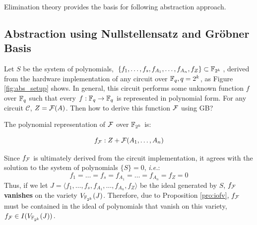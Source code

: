 Elimination theory provides the basis for following abstraction approach.
\subsection{Abstraction using Nullstellensatz and Gr\"obner Basis}
\begin{figure}[H]
\end{figure}

\begin{Problem}
\label{setup:abs}
Let $S$ be the system of polynomials, 
$\{f_1,\dots,f_s,f_{A_1},\dots,f_{A_n},f_{Z}\}\subset {\mathbb{F}}_{2^k}$, 
derived from the hardware
implementation of any circuit over ${\mathbb{F}}_{q}, q=2^k$, as Figure \ref{fig:abs_setup} shows.
In general, this circuit performs some unknown function $f$ over 
${\mathbb{F}}_{q}$ such that every $f:{\mathbb{F}}_{q}\to{\mathbb{F}}_{q}$ is represented in polynomial form.
For any circuit $\mathcal C$, $Z = {\mathcal{F}}(A)$. Then how to derive this function ${\mathcal{F}}$
using GB?
\end{Problem}

The polynomial representation of ${\mathcal{F}}$ over ${\mathbb{F}}_{2^k}$ is:

\begin{equation}
f_{{\mathcal{F}}}: Z+{\mathcal{F}}(A_1,\dots,A_n) \nonumber
\end{equation}

Since $f_{{\mathcal{F}}}$ is ultimately derived from the circuit implementation, 
it agrees with the solution to the system of polynomials $\{S\}=0$, {\it i.e.}:
\begin{equation}
f_1=\dots=f_s=f_{A_1}=\dots=f_{A_n}=f_{Z}=0 \nonumber
\end{equation}
Thus, if we let $J=\langle f_1,\dots,f_s,f_{A_1},\dots,f_{A_n},f_{Z}\rangle$ 
be the ideal generated by $S$, 
$f_{{\mathcal{F}}}$ {\bf vanishes} on the variety $V_{{\mathbb{F}}_{2^k}}(J)$. 
Therefore, due to Proposition \ref{pro:iofv}, 
$f_{{\mathcal{F}}}$ must be contained in the ideal of polynomials that vanish on
this variety, $f_{{\mathcal{F}}} \in I(V_{{\mathbb{F}}_{2^k}}(J))$. 

